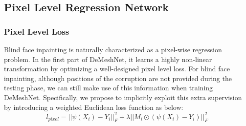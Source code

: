 \documentclass[10pt,twocolumn,letterpaper]{article}
\begin{document}








\subsection{Pixel Level Regression Network}

\subsubsection{Pixel Level Loss}Blind face inpainting is naturally characterized as a pixel-wise regression problem. In the first part of DeMeshNet, it learns a highly non-linear transformation by optimizing a well-designed pixel level loss. For blind face inpainting, although positions of the corruption are not provided during the testing phase, we can still make use of this information when training DeMeshNet. Specifically, we propose to implicitly exploit this extra supervision by introducing a weighted Euclidean loss function as below:
\begin{equation}{l_{pixel}} =||\psi ({X_i} ) - {Y_i}||_F^2 + \lambda ||{M_i} \odot (\psi ({X_i} ) - {Y_i})||_F^2
\end{equation}
\end{document}
